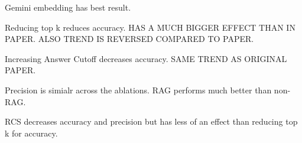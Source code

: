 Gemini embedding has best result. 

Reducing top k reduces accuracy. HAS A MUCH BIGGER EFFECT THAN IN PAPER. ALSO TREND IS REVERSED COMPARED TO PAPER. 

Increasing Answer Cutoff decreases accuracy. SAME TREND AS ORIGINAL PAPER. 

Precision is simialr across the ablations. RAG performs much better than non-RAG. 

RCS decreases accuracy and precision but has less of an effect than reducing top k for accuracy. 





